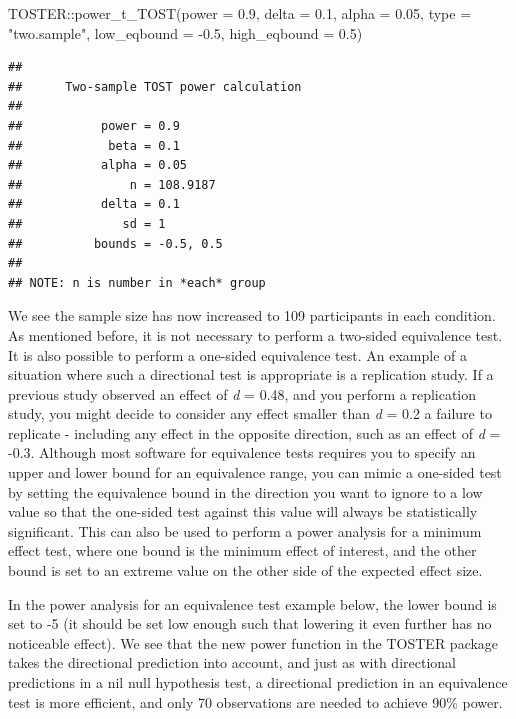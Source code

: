 \documentclass[
  oneside]{krantz}
\makeatletter
\newenvironment{Shaded}{\begin{snugshade}}{\end{snugshade}}
\newcommand{\AttributeTok}[1]{\textcolor[rgb]{0.61,0.61,0.61}{#1}}
\newcommand{\FloatTok}[1]{\textcolor[rgb]{0.06,0.06,0.06}{#1}}
\newcommand{\FunctionTok}[1]{\textcolor[rgb]{0,0,0}{#1}}
\newcommand{\NormalTok}[1]{#1}
\newcommand{\SpecialCharTok}[1]{\textcolor[rgb]{0,0,0}{#1}}
\newcommand{\StringTok}[1]{\textcolor[rgb]{0.5,0.5,0.5}{#1}}
\newenvironment{kframe}{%
\medskip{}
\setlength{\fboxsep}{.8em}
 \def\at@end@of@kframe{}%
 \ifinner\ifhmode%
  \def\at@end@of@kframe{\end{minipage}}%
  \begin{minipage}{\columnwidth}%
 \fi\fi%
 \def\FrameCommand##1{\hskip\@totalleftmargin \hskip-\fboxsep
 \colorbox{shadecolor}{##1}\hskip-\fboxsep
     \hskip-\linewidth \hskip-\@totalleftmargin \hskip\columnwidth}%
 \MakeFramed {\advance\hsize-\width
   \@totalleftmargin\z@ \linewidth\hsize
   \@setminipage}}%
 {\par\unskip\endMakeFramed%
 \at@end@of@kframe}
\renewenvironment{Shaded}{\begin{kframe}}{\end{kframe}}
\makeatother
\begin{document}
\begin{Shaded}
\begin{Highlighting}[]
\NormalTok{TOSTER}\SpecialCharTok{::}\FunctionTok{power\_t\_TOST}\NormalTok{(}\AttributeTok{power =} \FloatTok{0.9}\NormalTok{, }\AttributeTok{delta =} \FloatTok{0.1}\NormalTok{,}
                     \AttributeTok{alpha =} \FloatTok{0.05}\NormalTok{, }\AttributeTok{type =} \StringTok{"two.sample"}\NormalTok{,}
                     \AttributeTok{low\_eqbound =} \SpecialCharTok{{-}}\FloatTok{0.5}\NormalTok{, }\AttributeTok{high\_eqbound =} \FloatTok{0.5}\NormalTok{)}
\end{Highlighting}
\end{Shaded}

\begin{verbatim}
## 
##      Two-sample TOST power calculation 
## 
##           power = 0.9
##            beta = 0.1
##           alpha = 0.05
##               n = 108.9187
##           delta = 0.1
##              sd = 1
##          bounds = -0.5, 0.5
## 
## NOTE: n is number in *each* group
\end{verbatim}

We see the sample size has now increased to 109 participants in each condition. As mentioned before, it is not necessary to perform a two-sided equivalence test. It is also possible to perform a one-sided equivalence test. An example of a situation where such a directional test is appropriate is a replication study. If a previous study observed an effect of \emph{d} = 0.48, and you perform a replication study, you might decide to consider any effect smaller than \emph{d} = 0.2 a failure to replicate - including any effect in the opposite direction, such as an effect of \emph{d} = -0.3. Although most software for equivalence tests requires you to specify an upper and lower bound for an equivalence range, you can mimic a one-sided test by setting the equivalence bound in the direction you want to ignore to a low value so that the one-sided test against this value will always be statistically significant. This can also be used to perform a power analysis for a minimum effect test, where one bound is the minimum effect of interest, and the other bound is set to an extreme value on the other side of the expected effect size.

In the power analysis for an equivalence test example below, the lower bound is set to -5 (it should be set low enough such that lowering it even further has no noticeable effect). We see that the new power function in the TOSTER package takes the directional prediction into account, and just as with directional predictions in a nil null hypothesis test, a directional prediction in an equivalence test is more efficient, and only 70 observations are needed to achieve 90\% power.
\end{document}
